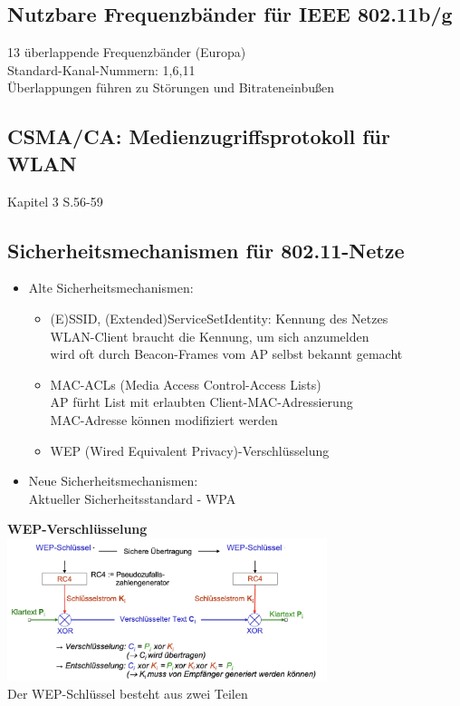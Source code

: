 \documentclass{scrreprt}
\begin{document}
\subsection{Nutzbare Frequenzbänder für IEEE 802.11b/g}
13 überlappende Frequenzbänder (Europa)
\\\tab Standard-Kanal-Nummern: 1,6,11
\\Überlappungen führen zu Störungen und Bitrateneinbußen
\subsection{CSMA/CA: Medienzugriffsprotokoll für WLAN}
Kapitel 3 S.56-59
\subsection{Sicherheitsmechanismen für 802.11-Netze}
\begin{itemize}
	\item Alte Sicherheitsmechanismen:
 	\begin{itemize}
	 	\item (E)SSID, (Extended)ServiceSetIdentity: Kennung des Netzes
		\\WLAN-Client braucht die Kennung, um sich anzumelden
		\\wird oft durch Beacon-Frames vom AP selbst bekannt gemacht
		\item MAC-ACLs (Media Access Control-Access Lists)
		\\AP fürht List mit erlaubten Client-MAC-Adressierung
		\\MAC-Adresse können modifiziert werden
		\item WEP (Wired Equivalent Privacy)-Verschlüsselung
 	\end{itemize}
	\item Neue Sicherheitsmechanismen:
	\\Aktueller Sicherheitsstandard - WPA
\end{itemize}
\textbf{WEP-Verschlüsselung}
\\\includegraphics[width=0.70\textwidth]{"graphics/WEP"}
\\Der WEP-Schlüssel besteht aus zwei Teilen
\end{document}
